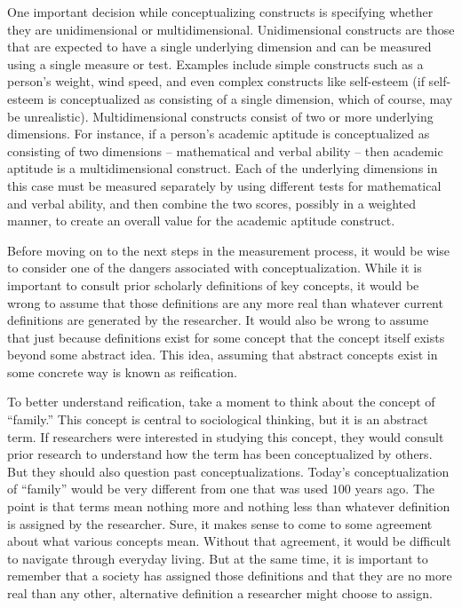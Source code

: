 One important decision while conceptualizing constructs is specifying whether they are unidimensional or multidimensional. Unidimensional constructs are those that are expected to have a single underlying dimension and can be measured using a single measure or test. Examples include simple constructs such as a person's weight, wind speed, and even complex constructs like self-esteem (if self-esteem is conceptualized as consisting of a single dimension, which of course, may be unrealistic). Multidimensional constructs consist of two or more underlying dimensions. For instance, if a person's academic aptitude is conceptualized as consisting of two dimensions – mathematical and verbal ability – then academic aptitude is a multidimensional construct. Each of the underlying dimensions in this case must be measured separately by using different tests for mathematical and verbal ability, and then combine the two scores, possibly in a weighted manner, to create an overall value for the academic aptitude construct.

Before moving on to the next steps in the measurement process, it would be wise to consider one of the dangers associated with conceptualization. While it is important to consult prior scholarly definitions of key concepts, it would be wrong to assume that those definitions are any more real than whatever current definitions are generated by the researcher. It would also be wrong to assume that just because definitions exist for some concept that the concept itself exists beyond some abstract idea. This idea, assuming that abstract concepts exist in some concrete way is known as reification.

To better understand reification, take a moment to think about the concept of ``family.'' This concept is central to sociological thinking, but it is an abstract term. If researchers were interested in studying this concept, they would consult prior research to understand how the term has been conceptualized by others. But they should also question past conceptualizations. Today's conceptualization of ``family'' would be very different from one that was used $ 100 $ years ago. The point is that terms mean nothing more and nothing less than whatever definition is assigned by the researcher. Sure, it makes sense to come to some agreement about what various concepts mean. Without that agreement, it would be difficult to navigate through everyday living. But at the same time, it is important to remember that a society has assigned those definitions and that they are no more real than any other, alternative definition a researcher might choose to assign.

